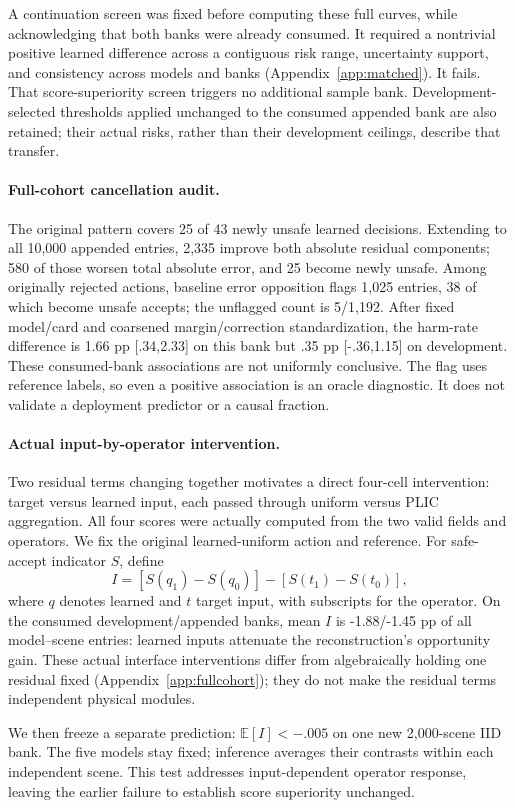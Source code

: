 A continuation screen was fixed before computing these full curves, while
 acknowledging that both banks were already consumed. It required a nontrivial
 positive learned difference across a contiguous risk range, uncertainty support,
 and consistency across models and banks (Appendix~\ref{app:matched}). It fails.
 That score-superiority screen triggers no additional sample bank. Development-selected
 thresholds applied unchanged to the consumed appended bank are also retained;
 their actual risks, rather than their development ceilings, describe that transfer.

\paragraph{Full-cohort cancellation audit.}
The original pattern covers 25 of 43 newly unsafe learned decisions. Extending
to all 10,000 appended entries, 2,335 improve both absolute residual components;
580 of those worsen total absolute error, and 25 become newly unsafe. Among
originally rejected actions, baseline error opposition flags 1,025 entries,
38 of which become unsafe accepts; the unflagged count is 5/1,192. After fixed
model/card and coarsened margin/correction standardization, the harm-rate
difference is 1.66 pp [.34,2.33] on this bank but .35 pp [-.36,1.15] on
development. These consumed-bank associations are not uniformly conclusive.
The flag uses reference labels, so even a positive association is an oracle
diagnostic. It does not validate a deployment predictor or a causal fraction.

\paragraph{Actual input-by-operator intervention.}
Two residual terms changing together motivates a direct four-cell intervention:
target versus learned input, each passed through uniform versus PLIC aggregation.
All four scores were actually computed from the two valid fields and operators.
We fix the original learned-uniform action and reference. For safe-accept
indicator $S$, define
\[
I=[S(q_1)-S(q_0)]-[S(t_1)-S(t_0)],
\]
where $q$ denotes learned and $t$ target input, with subscripts for the operator.
On the consumed development/appended banks, mean $I$ is -1.88/-1.45 pp of all
model--scene entries: learned inputs attenuate the reconstruction's opportunity
gain. These actual interface interventions differ from algebraically holding
one residual fixed (Appendix~\ref{app:fullcohort}); they do not make the residual
terms independent physical modules.

We then freeze a separate prediction:
$\mathbb E[I]<-.005$ on one new 2,000-scene IID bank. The five models stay fixed;
inference averages their contrasts within each independent scene. This test
addresses input-dependent operator response, leaving the earlier failure to
establish score superiority unchanged.


